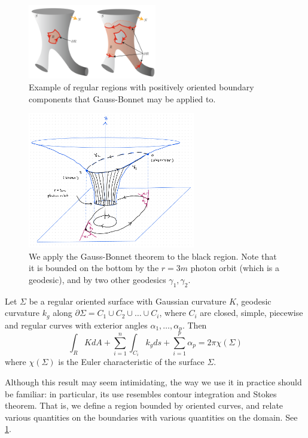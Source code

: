 %

\begin{figure}[!htb]
	\centering
	\includegraphics[width=0.5\textwidth]{img/global-gauss-bonnet.png}
	\caption{Example of regular regions with positively oriented boundary components that Gauss-Bonnet may be applied to.}
	\label{fig:gauss-bonnet-global}
\end{figure}

\begin{figure}[!htb]
	\centering
	\includegraphics[width=0.65\textwidth]{img/gauss-bonnet-setup.png}
	\caption{We apply the Gauss-Bonnet theorem to the black region. Note that it is bounded on the bottom by the $r=3m$ photon orbit (which is a geodesic), and by two other geodesics $\gamma_1, \gamma_2$.}
	\label{fig:gauss-bonnet-setup}
\end{figure}

\begin{theorem}\label{thm:gauss-bonnet}
Let $\Sigma$ be a regular oriented surface with Gaussian curvature $K$, geodesic curvature $k_g$ along $\partial \Sigma = C_1 \cup C_2 \cup \ldots \cup C_i$, where $C_i$ are closed, simple, piecewise and regular curves with exterior angles $\alpha_1, \ldots, \alpha_p$. Then
\begin{equation}\label{eq:gauss-bonnet}
\int_R K dA + \sum_{i=1}^n \int_{C_i} k_g ds + \sum_{i=1}^p \alpha_p = 2 \pi \chi(\Sigma)
\end{equation}
where $\chi(\Sigma)$ is the Euler characteristic of the surface $\Sigma$.
\end{theorem}
Although this result may seem intimidating, the way we use it in practice should be familiar: in particular, its use resembles contour integration and Stokes theorem. That is, we define a region bounded by oriented curves, and relate various quantities on the boundaries with various quantities on the domain. See \cref{fig:gauss-bonnet-global}.




